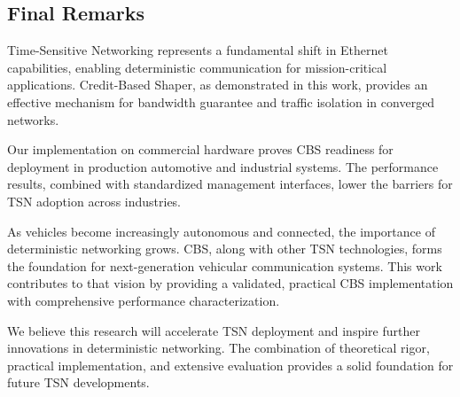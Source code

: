 \documentclass[10pt, journal, compsoc]{IEEEtran}
\begin{document}
\subsection{Final Remarks}

Time-Sensitive Networking represents a fundamental shift in Ethernet capabilities, enabling deterministic communication for mission-critical applications. Credit-Based Shaper, as demonstrated in this work, provides an effective mechanism for bandwidth guarantee and traffic isolation in converged networks.

Our implementation on commercial hardware proves CBS readiness for deployment in production automotive and industrial systems. The performance results, combined with standardized management interfaces, lower the barriers for TSN adoption across industries.

As vehicles become increasingly autonomous and connected, the importance of deterministic networking grows. CBS, along with other TSN technologies, forms the foundation for next-generation vehicular communication systems. This work contributes to that vision by providing a validated, practical CBS implementation with comprehensive performance characterization.

We believe this research will accelerate TSN deployment and inspire further innovations in deterministic networking. The combination of theoretical rigor, practical implementation, and extensive evaluation provides a solid foundation for future TSN developments.



\end{document}
